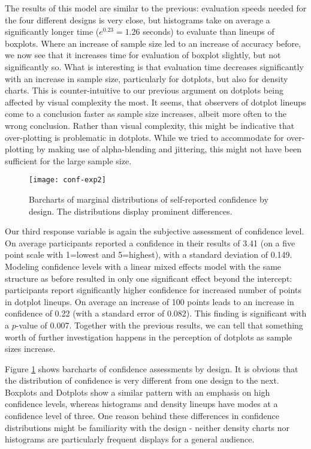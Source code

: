 The results of this model are similar to the previous: evaluation speeds needed for the four different designs is very close, but  histograms take on average a significantly longer time ($e^{0.23} = 1.26$ seconds) to evaluate than lineups of boxplots. 
Where an increase of sample size led to an increase of accuracy before, we now see that it increases time for evaluation of boxplot slightly, but not significantly so. What is interesting is that evaluation time decreases significantly with an increase in sample size, particularly for dotplots, but also for density charts. This is counter-intuitive to our previous argument on dotplots being affected by visual complexity the most. It seems, that observers of dotplot lineups come to a conclusion faster as sample size increases, albeit more often to  the wrong conclusion. Rather than visual complexity, this might be indicative that over-plotting is problematic in dotplots. While we tried to accommodate for over-plotting by making use of alpha-blending and jittering, this might not have been sufficient for the large sample size.
 
\begin{figure}[htbp] %
   \centering
   \texttt{[image: conf-exp2]} 
   \caption{Barcharts of marginal distributions of self-reported confidence by design. The distributions display prominent differences.}
   \label{fig:conf-margins}
\end{figure}

Our third response variable is again the subjective assessment of confidence level. On average participants reported a confidence in their results of  3.41 (on a five point scale with 1=lowest and 5=highest), with a standard deviation of 0.149. Modeling confidence levels with a linear mixed effects model with the same structure as before resulted in only one significant effect beyond the intercept: participants report significantly higher confidence for increased number of  points in dotplot lineups. On average an increase of 100 points leads to an increase in confidence of 0.22 (with a standard error of 0.082). This finding is significant with a $p$-value of 0.007. 
Together with the previous results, we can tell that something worth of further investigation happens in the perception of dotplots as sample sizes increase. 



Figure \ref{fig:conf-margins} shows barcharts of confidence assessments by design. It is obvious that the distribution of confidence is very different from one design to the next. Boxplots and Dotplots show a similar pattern with an emphasis on high confidence levels, whereas histograms and density lineups have modes at a confidence level of three. 
One reason behind these differences in confidence distributions might be familiarity with the design - neither density charts nor histograms are particularly frequent displays for a general audience. 




